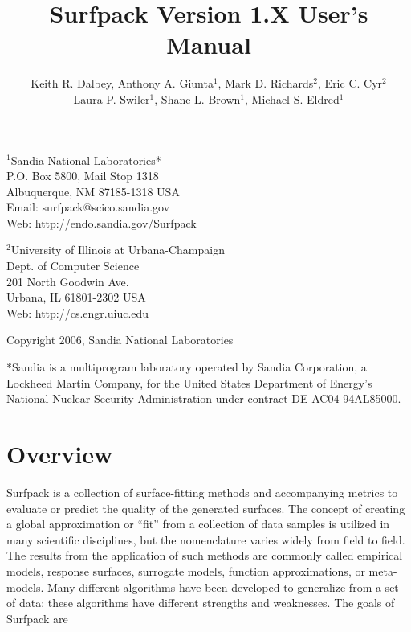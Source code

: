 \documentclass{article}
\begin{document}
\title{Surfpack Version 1.X User's Manual}

\author{Keith R. Dalbey, Anthony A. Giunta$^1$, Mark D. Richards$^2$, Eric C. Cyr$^2$ \\Laura P. Swiler$^1$, Shane L. Brown$^1$, Michael S. Eldred$^1$}

\maketitle


\begin{center}
$^1$Sandia National Laboratories*\\P.O. Box 5800, Mail Stop 1318\\Albuquerque, NM 87185-1318 USA \\
Email: surfpack@scico.sandia.gov \\ Web: http://endo.sandia.gov/Surfpack
\end{center}

\bigbreak

\begin{center}
$^2$University of Illinois at Urbana-Champaign\\Dept. of Computer Science\\201 North Goodwin Ave.\\Urbana, IL 61801-2302 USA\\
Web: http://cs.engr.uiuc.edu
\end{center}

\bigbreak

\begin{center}
Copyright 2006, Sandia National Laboratories
\end{center}

\bigbreak

\begin{center}
*Sandia is a multiprogram laboratory operated by Sandia Corporation, a Lockheed Martin Company, 
for the United States Department of Energy's National Nuclear Security Administration under 
contract DE-AC04-94AL85000.
\end{center}







\pagebreak



\section {Overview}\label{sec:overview}
Surfpack is a collection of surface-fitting methods and accompanying metrics to evaluate or predict the quality of the generated surfaces.  The concept of creating a global approximation or ``fit'' from a collection of data samples is utilized in many scientific disciplines, but the nomenclature varies widely from field to field.  The results from the application of such methods are commonly called empirical models, response surfaces, surrogate models, function approximations, or meta-models.  Many different algorithms have been developed to generalize from a set of data; these algorithms have different strengths and weaknesses.  The goals of Surfpack are
\end{document}
